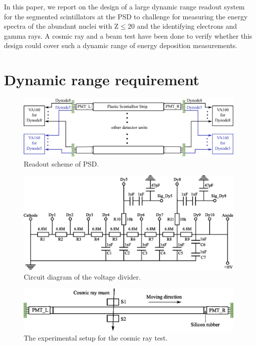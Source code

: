 \documentclass[5p, times]{elsarticle}
\begin{document}
In this paper, we report on the design of a large dynamic range readout system for the segmented scintillators at the
PSD to challenge for measuring the energy spectra of the abundant nuclei with Z${\leq}$20 and the identifying electrons
and gamma rays. A cosmic ray and a beam test have been done to verify whether this design could cover such a dynamic
range of energy deposition measurements.

\section{Dynamic range requirement}
\label{sec:requirement}

\begin{figure}
\centering
 \includegraphics[width=140mm]{readout_scheme}
\caption{Readout scheme of PSD.}
\label{fig:readout_scheme}
\end{figure} 

\begin{figure}
\centering
 \includegraphics[width=140mm]{divider}
\caption{Circuit diagram of the voltage divider.}
\label{fig:divider}
\end{figure} 

\begin{figure}[t]
 \centering
 \includegraphics[width=140mm]{cosmic_test}
\caption{The experimental setup for the cosmic ray test.}
\label{fig:cosmic_test}
\end{figure} 
\end{document}

